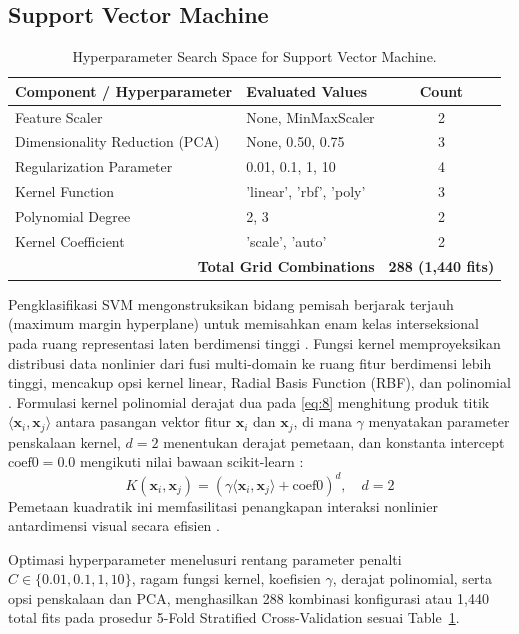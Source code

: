 \subsection{Support Vector Machine}
\label{sec:support_vector_machine}

\begin{table}[htbp]
\caption{Hyperparameter Search Space for Support Vector Machine.}
\label{tab:VI}
\centering
\begin{tabular}{llc}
\toprule
Component / Hyperparameter & Evaluated Values & Count \\
\midrule
Feature Scaler & None, MinMaxScaler & 2 \\
Dimensionality Reduction (PCA) & None, 0.50, 0.75 & 3 \\
Regularization Parameter & 0.01, 0.1, 1, 10 & 4 \\
Kernel Function & 'linear', 'rbf', 'poly' & 3 \\
Polynomial Degree & 2, 3 & 2 \\
Kernel Coefficient & 'scale', 'auto' & 2 \\
\midrule
\multicolumn{2}{r}{\textbf{Total Grid Combinations}} & \textbf{288 (1,440 fits)} \\
\bottomrule
\end{tabular}
\end{table}

Pengklasifikasi SVM mengonstruksikan bidang pemisah berjarak terjauh (maximum margin hyperplane) untuk memisahkan enam kelas interseksional pada ruang representasi laten berdimensi tinggi \cite{ref40}. Fungsi kernel memproyeksikan distribusi data nonlinier dari fusi multi-domain ke ruang fitur berdimensi lebih tinggi, mencakup opsi kernel linear, Radial Basis Function (RBF), dan polinomial \cite{ref41}. Formulasi kernel polinomial derajat dua pada \eqref{eq:8} menghitung produk titik $\langle \mathbf{x}_i, \mathbf{x}_j \rangle$ antara pasangan vektor fitur $\mathbf{x}_i$ dan $\mathbf{x}_j$, di mana $\gamma$ menyatakan parameter penskalaan kernel, $d = 2$ menentukan derajat pemetaan, dan konstanta intercept $\text{coef0} = 0.0$ mengikuti nilai bawaan scikit-learn \cite{ref42}:
\begin{equation}
K(\mathbf{x}_i, \mathbf{x}_j) = (\gamma \langle \mathbf{x}_i, \mathbf{x}_j \rangle + \text{coef0})^d, \quad d = 2
\label{eq:8}
\end{equation}
Pemetaan kuadratik ini memfasilitasi penangkapan interaksi nonlinier antardimensi visual secara efisien \cite{ref43}.

Optimasi hyperparameter menelusuri rentang parameter penalti $C \in \{0.01, 0.1, 1, 10\}$, ragam fungsi kernel, koefisien $\gamma$, derajat polinomial, serta opsi penskalaan dan PCA, menghasilkan 288 kombinasi konfigurasi atau 1,440 total fits pada prosedur 5-Fold Stratified Cross-Validation sesuai Table~\ref{tab:VI}.

